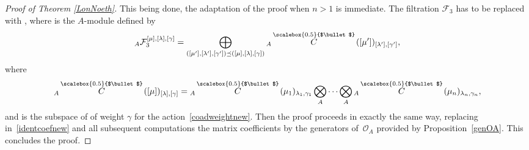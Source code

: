 \documentclass[10pt,a4paper]{amsart}
\numberwithin{equation}{section}
\theoremstyle{definition}
\newcommand{\Oo}{{\mathcal O}}
\newcommand{\smallbullet}{%
\vcenter{\hbox{\,\scalebox{0.5}{$\bullet$}\,}}
}
\begin{document}
\begin{proof}[Proof of Theorem \ref{LonNoeth}]
This being done, the adaptation of the proof when $n>1$ is immediate. The filtration $\mathcal{F}_3$ has to be replaced with , where  is the $A$-module defined by
\[
{}_A{\mathcal F}_3^{[\mu],[\lambda],[\gamma]}=\bigoplus_{([\mu'],[\lambda'],[\gamma'])\preceq ([\mu],[\lambda],[\gamma])} {}_A \overset{\raisebox{-1.5pt}{\scriptsize$\smallbullet$}}{C} ([\mu'])_{[\lambda'],[\gamma']},
\]
where
\[
{}_A \overset{\raisebox{-1.5pt}{\scriptsize$\smallbullet$}}{C} ([\mu])_{[\lambda],[\gamma]} ={}_A \overset{\raisebox{-1.5pt}{\scriptsize$\smallbullet$}}{C} (\mu_1)_{\lambda_1,\gamma_1}\bigotimes_A \dots \bigotimes_A {}_A \overset{\raisebox{-1.5pt}{\scriptsize$\smallbullet$}}{C} (\mu_n)_{\lambda_n,\gamma_n},
\]
 and \smash{${}_A \overset{\raisebox{-1.5pt}{\scriptsize$\smallbullet$}}{C} (\mu)_{\lambda,\gamma}$} is the subspace of \smash{${}_A \overset{\raisebox{-1.5pt}{\scriptsize$\smallbullet$}}{C} (\mu)_{\lambda}$} of weight $\gamma$ for the action~\eqref{coadweightnew}. Then the proof proceeds in exactly the same way, replacing in~\eqref{identcoefnew} and all subsequent computations the matrix coefficients by the generators of~$\Oo_A$ provided by Proposition~\ref{genOA}. This concludes the proof.
\end{proof}
\end{document}
